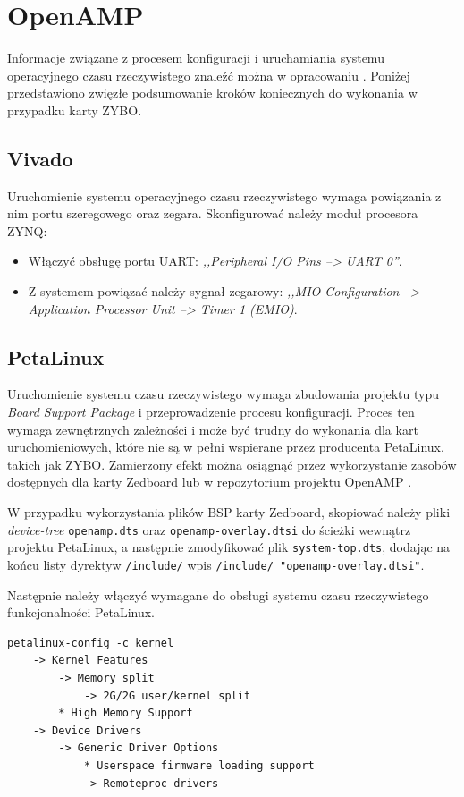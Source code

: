 \section{OpenAMP}
\label{sec:openamp-config}

Informacje związane z procesem konfiguracji i uruchamiania systemu operacyjnego czasu rzeczywistego znaleźć można w opracowaniu \cite{openamp-guide}. Poniżej przedstawiono zwięzłe podsumowanie kroków koniecznych do wykonania w przypadku karty ZYBO.
\subsection{Vivado}
Uruchomienie systemu operacyjnego czasu rzeczywistego wymaga powiązania z nim portu szeregowego oraz zegara.
Skonfigurować należy moduł procesora ZYNQ:
\begin{itemize}
	\item Włączyć obsługę portu UART: \emph{,,Peripheral I/O Pins --> UART 0''}.
	\item Z systemem powiązać należy sygnał zegarowy: \emph{,,MIO Configuration --> Application Processor Unit --> Timer 1 (EMIO)}.
\end{itemize}

\subsection{PetaLinux}

Uruchomienie systemu czasu rzeczywistego wymaga zbudowania projektu typu \emph{Board Support Package} i przeprowadzenie procesu konfiguracji. Proces ten wymaga zewnętrznych zależności i może być trudny do wykonania dla kart uruchomieniowych, które nie są w pełni wspierane przez producenta PetaLinux, takich jak ZYBO. Zamierzony efekt można osiągnąć przez wykorzystanie zasobów dostępnych dla karty Zedboard lub w repozytorium projektu OpenAMP \cite{openamp-repo}.

W przypadku wykorzystania plików BSP karty Zedboard, skopiować należy pliki \emph{device-tree} \texttt{openamp.dts} oraz \texttt{openamp-overlay.dtsi} do ścieżki  wewnątrz projektu PetaLinux, a następnie zmodyfikować plik \texttt{system-top.dts}, dodając na końcu listy dyrektyw \texttt{/include/} wpis \texttt{/include/ "openamp-overlay.dtsi"}.

Następnie należy włączyć wymagane do obsługi systemu czasu rzeczywistego funkcjonalności PetaLinux.

\begin{lstlisting}
petalinux-config -c kernel
	-> Kernel Features
		-> Memory split
			-> 2G/2G user/kernel split
		* High Memory Support
	-> Device Drivers
		-> Generic Driver Options
			* Userspace firmware loading support
			-> Remoteproc drivers
\end{lstlisting}

